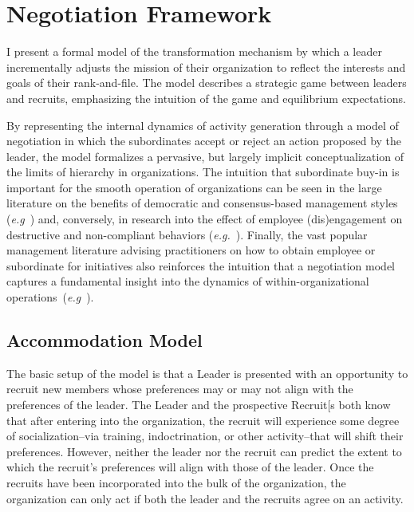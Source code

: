 \section{Negotiation Framework}

I present a formal model of the transformation mechanism by which a leader incrementally adjusts the mission of their organization to reflect the interests and goals of their rank-and-file. The model describes a strategic game between leaders and recruits, emphasizing the intuition of the game and equilibrium expectations.

By representing the internal dynamics of activity generation through a  model of negotiation in which the subordinates accept or reject an action proposed by the leader, the model formalizes a pervasive, but largely implicit conceptualization of the limits of hierarchy in organizations.  The intuition that subordinate buy-in is important for the smooth operation of organizations can be seen in the large literature on the benefits of democratic and consensus-based management styles (\textit{e.g}~\cite{covin1988influence, kastelle2013hierarchy, morris2000experimental}) and, conversely, in research into the effect of employee (dis)engagement on destructive and non-compliant behaviors (\textit{e.g.}~\cite{ariani2013relationship,dalal2012relative, spector2010counterproductive}). Finally, the vast popular management literature advising practitioners on how to obtain employee or subordinate  for initiatives also reinforces the intuition that a negotiation model captures a fundamental insight into the dynamics of within-organizational operations~(\textit{e.g}~\cite{broder2013buy, hedges2015buy,hubspot2020tips, kotter2010buy, ridzi2004making, thomson1999buy, thomson2000business}).

\subsection{Accommodation Model}

The basic setup of the model is that a Leader is presented with an opportunity to recruit new members whose preferences may or may not align with the preferences of the leader. The Leader and the prospective Recruit[s both know that after entering into the organization, the recruit will experience some degree of socialization--via training, indoctrination, or other activity--that will shift their preferences. However, neither the leader nor the recruit can predict the extent to which the recruit’s preferences will align with those of the leader. Once the recruits have been incorporated into the bulk of the organization, the organization can only act if both the leader and the recruits agree on an activity. 

